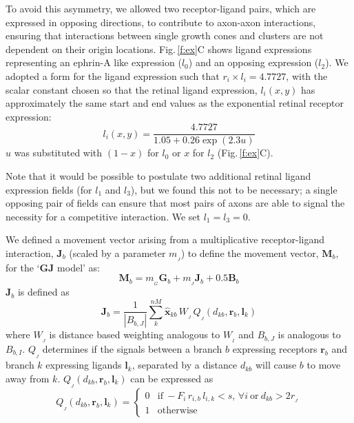 \documentclass[11pt, a4paper, draft]{article}
\begin{document}
To avoid this asymmetry, we allowed two receptor-ligand pairs, which are
expressed in opposing directions, to contribute to axon-axon interactions,
ensuring that interactions between single growth cones and clusters are not
dependent on their origin locations. Fig.\,\ref{f:ex}C shows ligand
expressions representing an ephrin-A like expression ($l_0$) and an opposing
expression ($l_2$). We adopted a form for the ligand expression such that
$r_i \times l_i = 4.7727$, with the scalar constant chosen so that the retinal
ligand expression, $l_i(x,y)$ has approximately the same start and end values
as the exponential retinal receptor expression:
%
\begin{equation}
 \label{e:retligexp}
l_i(x,y) = \frac{4.7727}{1.05 + 0.26 \exp (2.3 u)}
\end{equation}
$u$ was substituted with $(1-x)$ for $l_0$ or $x$ for $l_2$ (Fig.\,\ref{f:ex}C).
%

Note that it would be possible to postulate two additional retinal ligand
expression fields (for $l_1$ and $l_3$), but we found this not to be
necessary; a single opposing pair of fields can ensure that most pairs of
axons are able to signal the necessity for a competitive interaction. We set
$l_1 = l_3 = 0$.

We defined a movement vector arising from a multiplicative receptor-ligand
interaction, $\mathbf{J}_b$ (scaled by a parameter $m_{\!_J}$) to define the
movement vector, $\mathbf{M}_b$, for the `$\mathbf{GJ}$ model' as:
%
\begin{equation} \label{e:mv3}
 \mathbf{M}_{b} = m_{\!_G} \mathbf{G}_b + m_{\!_J} \mathbf{J}_b + 0.5 \mathbf{B}_b
\end{equation}
%
%
$\mathbf{J}_b$ is defined as
%
\begin{equation}
\mathbf{J}_b = \frac{1}{|B_{b,J}|} \sum_k^{nM} \hat{\mathbf{x}}_{kb}\,W_{\!_J}\,Q_{\!_J}(d_{kb}, \mathbf{r}_{b}, \mathbf{l}_{k})
\end{equation}
%
where $W_{\!_J}$ is distance based weighting analogous to $W_{\!_I}$ and
$B_{b,J}$ is analogous to $B_{b,I}$. $Q_{\!_J}$ determines if the signals
between a branch $b$ expressing receptors $\mathbf{r}_b$ and branch $k$
expressing ligands $\mathbf{l}_k$, separated by a distance $d_{kb}$ will cause
$b$ to move away from $k$. $Q_{\!_J}(d_{kb}, \mathbf{r}_{b}, \mathbf{l}_{k})$
can be expressed as
%
\begin{equation}
Q_{\!_J}(d_{kb}, \mathbf{r}_{b}, \mathbf{l}_{k}) = \begin{cases}
                 0 & \mathrm{if}~-F_i\,r_{i,b}\,l_{i,k} <
                 s,\,\forall{i}~\mathrm{or}~d_{kb} > 2r_{\!_J} \\
                 1 & \mathrm{otherwise}
     \end{cases}
\end{equation}
\end{document}
